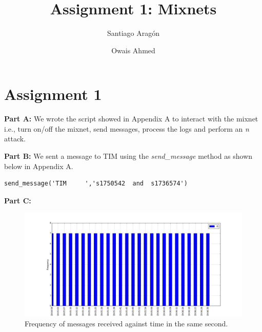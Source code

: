 \documentclass[preprint,12pt,3p]{elsarticle}
\begin{document}
\begin{frontmatter}

\title{Assignment 1: Mixnets}

\author{Santiago Aragón}
\address{s.e.aragonramirez@student.utwente.nl}

\author{Owais Ahmed}
\address{o.ahmed@student.utwente.nl}
\address{University of Twente}



\end{frontmatter}





\section*{Assignment 1}
\textbf{Part A:}
We wrote the script showed in Appendix A to interact with the mixnet i.e., turn on/off the mixnet, send messages, process the logs and perform an \textit{n} attack.
\newline

\textbf{Part B:}
We sent a message to TIM using the \textit{send\_message} method as shown below in Appendix A.
\begin{verbatim}send_message('TIM     ','s1750542  and  s1736574') \end{verbatim}

\textbf{Part C:}

\begin{figure}[h]
\caption{Frequency of messages received against time in the same second.}
\centering
\includegraphics[width=\textwidth]{one_c}
\end{figure}
\end{document}
